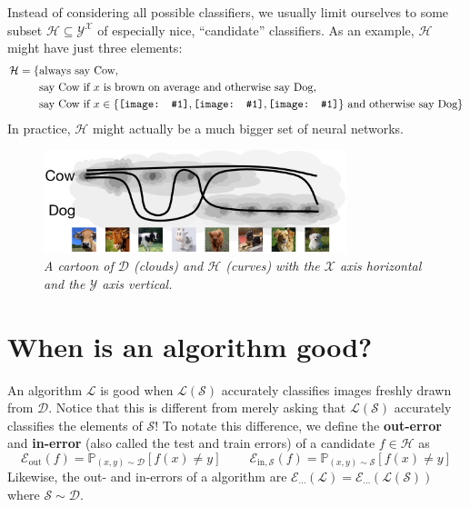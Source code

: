 \documentclass[openany, notitlepage, justified]{tufte-book}
\newcommand{\PP}{\mathbb{P}}
\newcommand{\Dd}{\mathcal{D}}
\newcommand{\Ee}{\mathcal{E}}
\newcommand{\Hh}{\mathcal{H}}
\newcommand{\Ll}{\mathcal{L}}
\newcommand{\Ss}{\mathcal{S}}
\newcommand{\Xx}{\mathcal{X}}
\newcommand{\Yy}{\mathcal{Y}}
\newcommand{\sdia}[1]{%
    \begingroup%
    \setbox0=\hbox{\texttt{[image: \#1]}}%
    \parbox{\wd0}{\box0}\endgroup%
}
\newcommand{\Ein}{\Ee_{\text{in},\Ss}}
\newcommand{\Eout}{\Ee_{\text{out}}}
\begin{document}
            Instead of considering all possible classifiers, we usually limit
            ourselves to some subset $\Hh \subseteq \Yy^{\Xx}$ of especially
            nice, ``candidate'' classifiers.
            As an example, $\Hh$ might have just three elements:
            \begin{align*}
                \Hh = \{
                    &\text{always say Cow}, \\
                    &\text{say Cow if $x$ is brown on average
                        and otherwise say Dog}, \\
                    &\text{say Cow if
                        $x \in \{\sdia{cow-b}, \sdia{cow-c}, \sdia{cow-e}\}$
                        and otherwise say Dog}
                \}
            \end{align*}
            In practice, $\Hh$ might actually be a much bigger set of neural
            networks.
            \begin{figure}[h!]
                \centering
                \includegraphics[height=3cm]{hd}
                \caption{\emph{
                    A cartoon of $\Dd$ (clouds) and $\Hh$ (curves) with
                    the $\Xx$ axis horizontal and the $\Yy$ axis vertical. 
                }}
            \end{figure}

        \newpage
        \section{When is an algorithm good?}
            An algorithm $\Ll$ is good when $\Ll(\Ss)$ accurately classifies
            images freshly drawn from $\Dd$.  Notice that this is different
            from merely asking that $\Ll(\Ss)$ accurately classifies the
            elements of $\Ss$!  To notate this difference, we define the
            \textbf{out-error} and \textbf{in-error} (also called the test and
            train errors) of a candidate $f \in \Hh$
            as
            $$
                \Eout(f) = \PP_{(x,y)\sim\Dd} \left[
                               f(x) \neq y
                           \right]
                ~~~~~~~~~~
                \Ein(f) = \PP_{(x,y)\sim\Ss} \left[
                              f(x) \neq y
                          \right]
            $$
            Likewise, the out- and in-errors of a algorithm are
            $
                \Ee_{\cdots}(\Ll) = \Ee_{\cdots}(\Ll(\Ss)) 
            $ where $\Ss\sim\Dd$.
\end{document}

